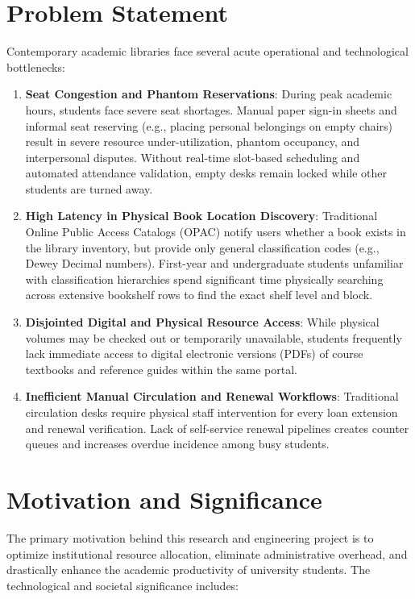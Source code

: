 \section{Problem Statement}
Contemporary academic libraries face several acute operational and technological bottlenecks:

\begin{enumerate}
    \item \textbf{Seat Congestion and Phantom Reservations}: During peak academic hours, students face severe seat shortages. Manual paper sign-in sheets and informal seat reserving (e.g., placing personal belongings on empty chairs) result in severe resource under-utilization, phantom occupancy, and interpersonal disputes. Without real-time slot-based scheduling and automated attendance validation, empty desks remain locked while other students are turned away.
    \item \textbf{High Latency in Physical Book Location Discovery}: Traditional Online Public Access Catalogs (OPAC) notify users whether a book exists in the library inventory, but provide only general classification codes (e.g., Dewey Decimal numbers). First-year and undergraduate students unfamiliar with classification hierarchies spend significant time physically searching across extensive bookshelf rows to find the exact shelf level and block.
    \item \textbf{Disjointed Digital and Physical Resource Access}: While physical volumes may be checked out or temporarily unavailable, students frequently lack immediate access to digital electronic versions (PDFs) of course textbooks and reference guides within the same portal.
    \item \textbf{Inefficient Manual Circulation and Renewal Workflows}: Traditional circulation desks require physical staff intervention for every loan extension and renewal verification. Lack of self-service renewal pipelines creates counter queues and increases overdue incidence among busy students.
\end{enumerate}

\section{Motivation and Significance}
The primary motivation behind this research and engineering project is to optimize institutional resource allocation, eliminate administrative overhead, and drastically enhance the academic productivity of university students. The technological and societal significance includes:

